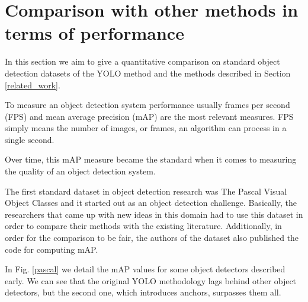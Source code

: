\section{Comparison with other methods in terms of performance} \label{comparison}

In this section we aim to give a quantitative comparison on standard object detection datasets of the YOLO method and the methods described in Section \ref{related_work}. 

To measure an object detection system performance usually frames per second (FPS) and mean average precision (mAP) are the most relevant measures. FPS simply means the number of images, or frames, an algorithm can process in a single second.


Over time, this mAP measure became the standard when it comes to measuring the quality of an object detection system.

The first standard dataset in object detection research was The Pascal Visual Object Classes \cite{pascal-voc} and it started out as an object detection challenge. Basically, the researchers that came up with new ideas in this domain had to use this dataset in order to compare their methods with the existing literature. Additionally, in order for the comparison to be fair, the authors of the dataset also published the code for computing mAP.

In Fig. \ref{pascal} we detail the mAP values for some object detectors described early. We can see that the original YOLO methodology lags behind other object detectors, but the second one, which introduces anchors, surpasses them all.


\def \scalevar {0.6}

